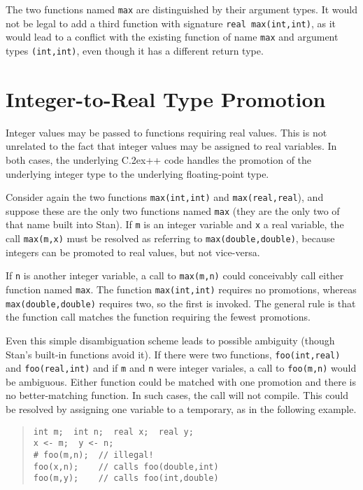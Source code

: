 \documentclass[10pt]{report}
\newcommand{\Stan}{Stan\xspace}
\newcommand*{\Cpp}{C\raise.2ex\hbox{\footnotesize ++}\xspace} %
\newcommand{\code}[1]{{\tt #1}}
\begin{document}
The two functions named \code{max} are distinguished by their argument
types.  It would not be legal to add a third function with signature
\code{real max(int,int)}, as it would lead to a conflict with the
existing function of name \code{max} and argument types
\code{(int,int)}, even though it has a different return type.


\section{Integer-to-Real Type Promotion}

Integer values may be passed to functions requiring real values.  This
is not unrelated to the fact that integer values may be assigned to
real variables.  In both cases, the underlying \Cpp code handles the
promotion of the underlying integer type to the underlying
floating-point type.

Consider again the two functions \code{max(int,int)} and
\code{max(real,real}), and suppose these are the only two functions
named \code{max} (they are the only two of that name built into
\Stan).  If \code{m} is an integer variable and \code{x} a real
variable, the call \code{max(m,x)} must be resolved as referring to
\code{max(double,double)}, because integers can be promoted to real
values, but not vice-versa.  

If \code{n} is another integer variable, a call to \code{max(m,n)}
could conceivably call either function named \code{max}.  The function
\code{max(int,int)} requires no promotions, whereas
\code{max(double,double)} requires two, so the first is invoked.  The
general rule is that the function call matches the function requiring
the fewest promotions.

Even this simple disambiguation scheme leads to possible ambiguity
(though \Stan's built-in functions avoid it).  If there were two functions,
\code{foo(int,real)} and \code{foo(real,int)} and if \code{m} and
\code{n} were integer variales, a call to \code{foo(m,n)} would be
ambiguous.  Either function could be matched with one promotion and
there is no better-matching function.  In such cases, the call will
not compile.  This could be resolved by assigning one variable to a
temporary, as in the following example.
%
\begin{quote}
\begin{Verbatim}
int m;  int n;  real x;  real y;  
x <- m;  y <- n;
# foo(m,n);  // illegal!
foo(x,n);    // calls foo(double,int)
foo(m,y);    // calls foo(int,double)
\end{Verbatim}
\end{quote}
\end{document}
